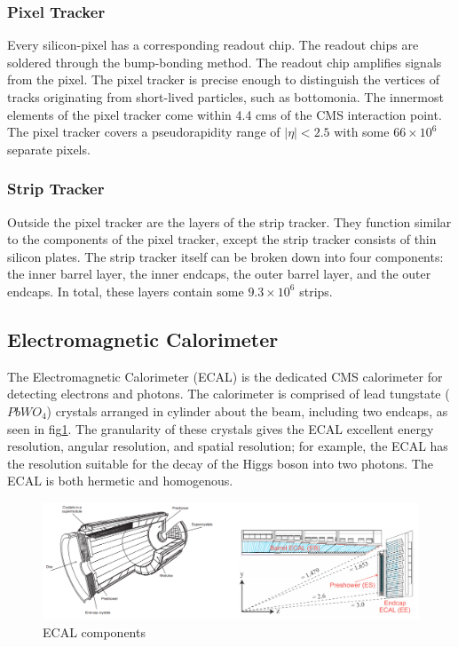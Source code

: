 \subsubsection{Pixel Tracker}

Every silicon-pixel has a corresponding readout chip. The readout chips are soldered through the bump-bonding method. The readout chip amplifies signals from the pixel. The pixel tracker is precise enough to distinguish the vertices of tracks originating from short-lived particles, such as bottomonia. The innermost elements of the pixel tracker come within 4.4 cms of the CMS interaction point. The pixel tracker covers a pseudorapidity range of $|\eta|<2.5$ with some $66 \times 10^6$ separate pixels.

\subsubsection{Strip Tracker}

Outside the pixel tracker are the layers of the strip tracker. They function similar to the components of the pixel tracker, except the strip tracker consists of thin silicon plates. The strip tracker itself can be broken down into four components: the inner barrel layer, the inner endcaps, the outer barrel layer, and the outer endcaps. In total, these layers contain some $9.3 \times 10^6$ strips. 

\subsection{Electromagnetic Calorimeter}

The Electromagnetic Calorimeter (ECAL) is the dedicated CMS calorimeter for detecting electrons and photons. The calorimeter is comprised of lead tungstate ($PbWO_4$) crystals arranged in cylinder about the beam, including two endcaps, as seen in fig\ref{fig:ecalComp}. The granularity of these crystals gives the ECAL excellent energy resolution, angular resolution, and spatial resolution; for example, the ECAL has the resolution suitable for the decay of the Higgs boson into two photons. The ECAL is both hermetic and homogenous. 

\begin{figure}[h!]
\begin{centering}
\includegraphics[width=7in]{Chapter3/importfigs/ecal_performance_with_examples.png}
\par\end{centering}
\caption{ECAL components \label{fig:ecalComp}}
\end{figure}


